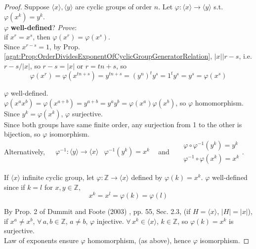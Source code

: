 \begin{proof}
	Suppose $\langle x \rangle, \langle y \rangle$ are cyclic groups of order $n$. Let $\varphi: \langle x \rangle \to \langle y \rangle$ s.t. $\varphi(x^k) = y^k$. \\
	
	$\varphi$ \textbf{well-defined}? \emph{Prove}: \\
	if $x^r = x^s$, then $\varphi(x^r) = \varphi(x^s)$. \\
	
	Since $x^{r-s} = 1$, by Prop. \ref{agat:Prop:OrderDividesExponentOfCyclicGroupGeneratorRelation}, $|x| | r-s$, i.e. $r-s / |x|$, so $r-s = |x|$ or $r = tn + s$, so 
	\[
	\varphi(x^r) = \varphi(x^{tn + s}) = y^{tn + s} = (y^n)^t y^s = 1^t y^s = y^s = \varphi(x^s)
	\]
	
	$\varphi$ well-defined. \\

$\varphi(x^a x^b) = \varphi(x^{a+b}) = y^{a+b} = y^a y^b = \varphi(x^a) \varphi(x^b)$, so $\varphi$ homomorphism.  \\

Since $y^k = \varphi(x^k)$, $\varphi$ surjective. \\

Since both groups have same finite order, any surjection from 1 to the other is bijection, so $\varphi$ isomorphism.  \\

Alternatively, $\begin{aligned}
& \varphi^{-1}:\langle y \rangle \to \langle x \rangle
& \varphi^{-1}(y^k) = x^k 
\end{aligned}$ \quad \, and \quad \, $\begin{aligned} & \varphi \circ \varphi^{-1}(y^k) = y^k \\
& \varphi^{-1}\circ \varphi(x^k) = x^k \end{aligned}$.

If $\langle x \rangle$ infinite cyclic group, let $\varphi : \mathbb{Z} \to \langle x \rangle$ defined by $\varphi(k) = x^k$.  $\varphi$ well-defined since if $k = l$ for $x,y \in \mathbb{Z}$, 
\[
x^k = x^l = \varphi(k) = \varphi(l)
\]

By Prop. 2 of Dummit and Foote (2003) \cite{agat:DuFo2003}, pp. 55, Sec. 2.3, (if $H=\langle x \rangle$, $|H| = |x|$), if $x^a \neq x^b$, $\forall\, a, b \in \mathbb{Z}$, $a\neq b$, $\varphi$ injective. $\forall \, x^k \in \langle x \rangle$, $k \in \mathbb{Z}$, so $\varphi(k) = x^k$ is surjective. \\
Law of exponents ensure $\varphi$ homomorphism, (as above), hence $\varphi$ isomorphism. 

\end{proof}

